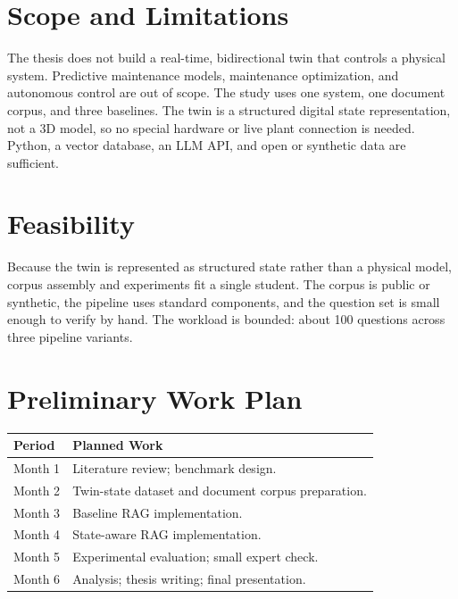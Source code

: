 \documentclass[10pt,a4paper]{article}
\begin{document}
\section{Scope and Limitations}

The thesis does not build a real-time, bidirectional twin that controls a physical system. Predictive maintenance models, maintenance optimization, and autonomous control are out of scope. The study uses one system, one document corpus, and three baselines. The twin is a structured digital state representation, not a 3D model, so no special hardware or live plant connection is needed. Python, a vector database, an LLM API, and open or synthetic data are sufficient.

\section{Feasibility}

Because the twin is represented as structured state rather than a physical model, corpus assembly and experiments fit a single student. The corpus is public or synthetic, the pipeline uses standard components, and the question set is small enough to verify by hand. The workload is bounded: about 100 questions across three pipeline variants.

\section{Preliminary Work Plan}

\begin{tabularx}{\textwidth}{|p{1.9cm}|X|}
\hline
\rowcolor{lightgray}
\textbf{Period} & \textbf{Planned Work} \\
\hline
Month 1 & Literature review; benchmark design. \\
\hline
Month 2 & Twin-state dataset and document corpus preparation. \\
\hline
Month 3 & Baseline RAG implementation. \\
\hline
Month 4 & State-aware RAG implementation. \\
\hline
Month 5 & Experimental evaluation; small expert check. \\
\hline
Month 6 & Analysis; thesis writing; final presentation. \\
\hline
\end{tabularx}
\end{document}

